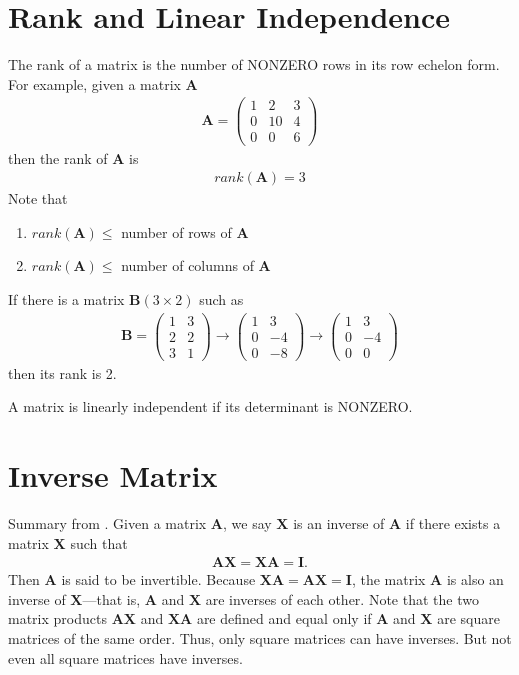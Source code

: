 \documentclass[10pt,a4paper]{book}
\theoremstyle{definition}\newtheorem{definition}{Definition}
\theoremstyle{definition}\newtheorem{fact}{Fact}
\theoremstyle{definition}\newtheorem{ex}{Ex.}
\theoremstyle{definition}\newtheorem{project}{Project}
\theoremstyle{definition}\newtheorem{problem}{Problem}
\theoremstyle{definition}\newtheorem{example}{Example}
\numberwithin{theorem}{chapter}
\numberwithin{corollary}{chapter}
\numberwithin{assumption}{chapter}
\numberwithin{definition}{chapter}
\numberwithin{prop}{chapter}
\numberwithin{notation}{chapter}
\numberwithin{problem}{chapter}
\numberwithin{example}{chapter}
\numberwithin{fact}{chapter}
\numberwithin{ex}{chapter}
\def\A{\mathbf A}
\def\B{\mathbf B}
\def\I{\mathbf I}
\def\X{\mathbf X}
\begin{document}
	\section{Rank and Linear Independence}
	The rank of a matrix is the number of NONZERO rows in its row echelon form. For example, given a matrix $\A$
	\begin{align*}
		\A = \begin{pmatrix}
			1 & 2 & 3 \\
			0 & 10 & 4 \\
			0 & 0 & 6
		\end{pmatrix}
	\end{align*}
	then the rank of $\A$ is
	\begin{align*}
		rank(\A) = 3
	\end{align*}
	Note that
	\begin{enumerate}
		\item $rank(\A) \leq $ number of rows of $\A$ 
		\item $rank(\A) \leq $ number of columns of $\A$
	\end{enumerate}
	If there is a matrix $\B (3\times 2)$ such as
	\begin{align*}
		\B = \begin{pmatrix}
			1 & 3 \\ 2 & 2 \\ 3 & 1
		\end{pmatrix} \rightarrow \begin{pmatrix}
		1 & 3 \\ 0 & -4 \\ 0 & -8 
	\end{pmatrix} \rightarrow \begin{pmatrix}
	1 & 3 \\ 0 & -4 \\ 0 & 0
\end{pmatrix}
	\end{align*}
	then its rank is 2.
	
	A matrix is linearly independent if its determinant is NONZERO.
	
	\newpage
	
	\section{Inverse Matrix}
	Summary from \citet{chiang1984fundamental}. Given a matrix $\A$, we say $\X$ is an inverse of $\A$ if there exists a matrix $\X$ such that
	\begin{align*}
		\A \X = \X \A = \I. 
	\end{align*}
	Then $\A$ is said to be invertible. Because $\X\A = \A \X = \I$, the matrix $\A$ is also an inverse of $\X$—that is, $\A$ and $\X$ are inverses of each other. Note that the two matrix products $\A \X$ and $\X \A$ are defined and equal only if $\A$ and $\X$ are square matrices of the same order. Thus, only square matrices can have inverses. But not even all square matrices have inverses.
	
\end{document}
